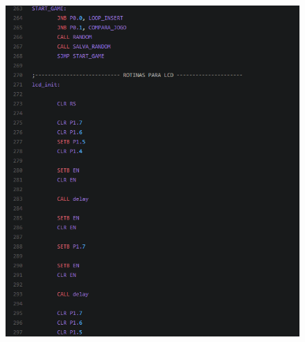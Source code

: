 \documentclass{article}
\begin{document}
\begin{figure}[H]
\hspace*{-1.0in}
\includegraphics[scale=1]{9.PNG}
\end{figure}
\end{document}
